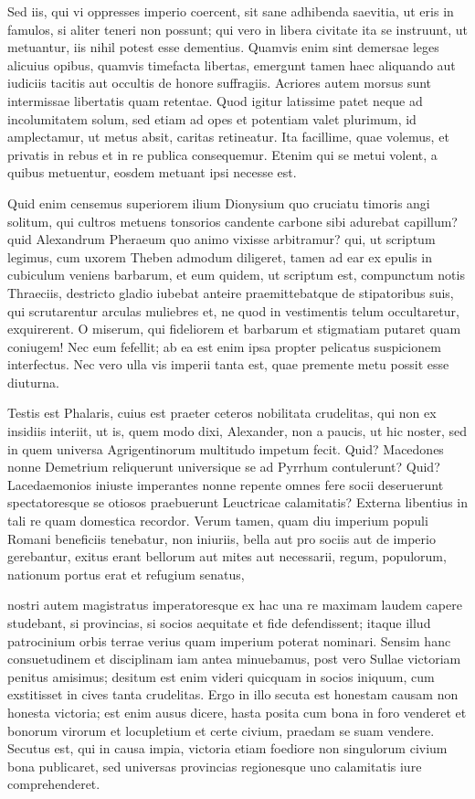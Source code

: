  Sed iis, qui vi oppresses imperio coercent, sit sane adhibenda saevitia, ut eris in famulos, si aliter teneri non possunt; qui vero in libera civitate ita se instruunt, ut metuantur, iis nihil potest esse dementius. Quamvis enim sint demersae leges alicuius opibus, quamvis timefacta libertas, emergunt tamen haec aliquando aut iudiciis tacitis aut occultis de honore suffragiis. Acriores autem morsus sunt intermissae libertatis quam retentae. Quod igitur latissime patet neque ad incolumitatem solum, sed etiam ad opes et potentiam valet plurimum, id amplectamur, ut metus absit, caritas retineatur. Ita facillime, quae volemus, et privatis in rebus et in re publica consequemur. Etenim qui se metui volent, a quibus metuentur, eosdem metuant ipsi necesse est.

 Quid enim censemus superiorem ilium Dionysium quo cruciatu timoris angi solitum, qui cultros metuens tonsorios candente carbone sibi adurebat capillum? quid Alexandrum Pheraeum quo animo vixisse arbitramur? qui, ut scriptum legimus, cum uxorem Theben admodum diligeret, tamen ad ear ex epulis in cubiculum veniens barbarum, et eum quidem, ut scriptum est, compunctum notis Thraeciis, destricto gladio iubebat anteire praemittebatque de stipatoribus suis, qui scrutarentur arculas muliebres et, ne quod in vestimentis telum occultaretur, exquirerent. O miserum, qui fideliorem et barbarum et stigmatiam putaret quam coniugem! Nec eum fefellit; ab ea est enim ipsa propter pelicatus suspicionem interfectus. Nec vero ulla vis imperii tanta est, quae premente metu possit esse diuturna.

 Testis est Phalaris, cuius est praeter ceteros nobilitata crudelitas, qui non ex insidiis interiit, ut is, quem modo dixi, Alexander, non a paucis, ut hic noster, sed in quem universa Agrigentinorum multitudo impetum fecit. Quid? Macedones nonne Demetrium reliquerunt universique se ad Pyrrhum contulerunt? Quid? Lacedaemonios iniuste imperantes nonne repente omnes fere socii deseruerunt spectatoresque se otiosos praebuerunt Leuctricae calamitatis? Externa libentius in tali re quam domestica recordor. Verum tamen, quam diu imperium populi Romani beneficiis tenebatur, non iniuriis, bella aut pro sociis aut de imperio gerebantur, exitus erant bellorum aut mites aut necessarii, regum, populorum, nationum portus erat et refugium senatus,

 nostri autem magistratus imperatoresque ex hac una re maximam laudem capere studebant, si provincias, si socios aequitate et fide defendissent; itaque illud patrocinium orbis terrae verius quam imperium poterat nominari. Sensim hanc consuetudinem et disciplinam iam antea minuebamus, post vero Sullae victoriam penitus amisimus; desitum est enim videri quicquam in socios iniquum, cum exstitisset in cives tanta crudelitas. Ergo in illo secuta est honestam causam non honesta victoria; est enim ausus dicere, hasta posita cum bona in foro venderet et bonorum virorum et locupletium et certe civium, praedam se suam vendere. Secutus est, qui in causa impia, victoria etiam foediore non singulorum civium bona publicaret, sed universas provincias regionesque uno calamitatis iure comprehenderet.


